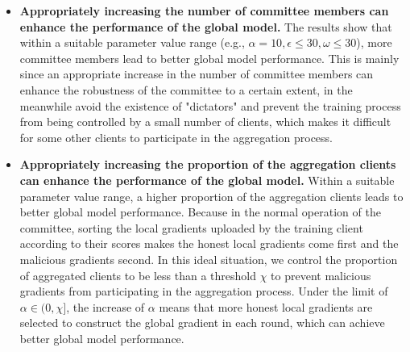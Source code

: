 \documentclass[10pt,journal,compsoc]{IEEEtran}
\begin{document}
\begin{itemize}
\item \textbf{Appropriately increasing the number of committee members can enhance the performance of the global model.} The results show that within a suitable parameter value range (e.g., $\alpha=10, \epsilon \leq 30, \omega \leq 30$), more committee members lead to better global model performance. This is mainly since an appropriate increase in the number of committee members can enhance the robustness of the committee to a certain extent, in the meanwhile avoid the existence of "dictators" and prevent the training process from being controlled by a small number of clients, which makes it difficult for some other clients to participate in the aggregation process. 
\item \textbf{Appropriately increasing the proportion of the aggregation clients can enhance the performance of the global model.} Within a suitable parameter value range, a higher proportion of the aggregation clients leads to better global model performance. Because in the normal operation of the committee, sorting the local gradients uploaded by the training client according to their scores makes the honest local gradients come first and the malicious gradients second. In this ideal situation, we control the proportion of aggregated clients to be less than a threshold $\chi$ to prevent malicious gradients from participating in the aggregation process. Under the limit of $\alpha \in (0,\chi]$, the increase of $\alpha$ means that more honest local gradients are selected to construct the global gradient in each round, which can achieve better global model performance.

\end{itemize}
\end{document}
